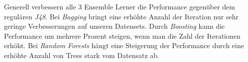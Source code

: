 Generell verbessern alle 3 Ensemble Lerner die Performance gegen\"uber dem regulären \emph{J48}. Bei \emph{Bagging} bringt eine erh\"ohte Anzahl der Iteration nur sehr geringe Verbesserungen auf unseren Datensets. Durch \emph{Boosting} kann die Performance um mehrere Prozent steigen, wenn man die Zahl der Iterationen erh\"oht. Bei \emph{Random Forests} h\"angt eine Steigerung der Performance durch eine erh\"ohte Anzahl von Trees stark vom Datensatz ab. 
